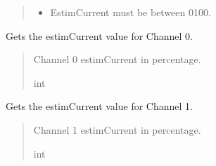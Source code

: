 \documentclass[letterpaper,10pt,english]{sphinxmanual}
\begin{document}
\begin{fulllineitems}
\begin{fulllineitems}
\begin{quote}
\begin{description}
\begin{itemize}
\item {} 
\sphinxAtStartPar
{} \textendash{} Estim\sphinxhyphen{}Current must be between 0\sphinxhyphen{}100.

\end{itemize}

\end{description}\end{quote}

\end{fulllineitems}


\begin{fulllineitems}
\label{\detokenize{Setup_PodParameters:Setup_PodParameters.Params_8480SC.estimCurrent_CH0}}
\pysigstartsignatures
{}
\pysigstopsignatures
\sphinxAtStartPar
Gets the estimCurrent value for Channel 0.
\begin{quote}\begin{description}
\sphinxAtStartPar
Channel 0 estimCurrent in percentage.

\sphinxAtStartPar
int

\end{description}\end{quote}

\end{fulllineitems}


\begin{fulllineitems}
\label{\detokenize{Setup_PodParameters:Setup_PodParameters.Params_8480SC.estimCurrent_CH1}}
\pysigstartsignatures
{}
\pysigstopsignatures
\sphinxAtStartPar
Gets the estimCurrent value for Channel 1.
\begin{quote}\begin{description}
\sphinxAtStartPar
Channel 1 estimCurrent in percentage.

\sphinxAtStartPar
int


\end{description}
\end{quote}
\end{fulllineitems}
\end{fulllineitems}
\end{document}
